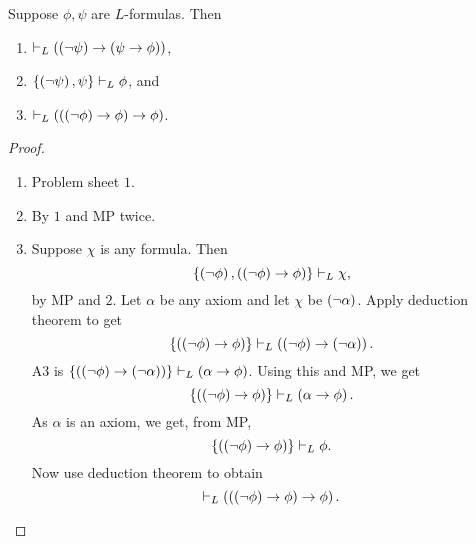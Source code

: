 \begin{proposition}
\label{prop:1.2.7}
Suppose $ \phi, \psi $ are $ L $-formulas. Then
\begin{enumerate}
\item $ \vdash_L \left( \left( \neg \psi \right) \rightarrow \left( \psi \rightarrow \phi \right) \right) $,
\item $ \left\{ \left( \neg \psi \right), \psi \right\} \vdash_L \phi $, and
\item $ \vdash_L \left( \left( \left( \neg \phi \right) \rightarrow \phi \right) \rightarrow \phi \right) $.
\end{enumerate}
\end{proposition}

\begin{proof}
\hfill
\begin{enumerate}
\item Problem sheet $ 1 $.
\item By $ 1 $ and MP twice.
\item Suppose $ \chi $ is any formula. Then
$$ \left\{ \left( \neg \phi \right), \left( \left( \neg \phi \right) \rightarrow \phi \right) \right\} \vdash_L \chi, $$
by MP and $ 2 $. Let $ \alpha $ be any axiom and let $ \chi $ be $ \left( \neg \alpha \right) $. Apply deduction theorem to get
$$ \left\{ \left( \left( \neg \phi \right) \rightarrow \phi \right) \right\} \vdash_L \left( \left( \neg \phi \right) \rightarrow \left( \neg \alpha \right) \right). $$
A3 is $ \left\{ \left( \left( \neg \phi \right) \rightarrow \left( \neg \alpha \right) \right) \right\} \vdash_L \left( \alpha \rightarrow \phi \right) $. Using this and MP, we get
$$ \left\{ \left( \left( \neg \phi \right) \rightarrow \phi \right) \right\} \vdash_L \left( \alpha \rightarrow \phi \right). $$
As $ \alpha $ is an axiom, we get, from MP,
$$ \left\{ \left( \left( \neg \phi \right) \rightarrow \phi \right) \right\} \vdash_L \phi. $$
Now use deduction theorem to obtain
$$ \vdash_L \left( \left( \left( \neg \phi \right) \rightarrow \phi \right) \rightarrow \phi \right). $$
\end{enumerate}
\end{proof}

\pagebreak

